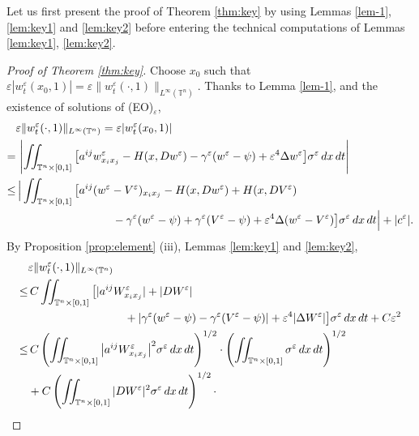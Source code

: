 \documentclass[12pt,reqno]{amsart}
\theoremstyle{plain}
\theoremstyle{remark}
\numberwithin{equation}{section}
\begin{document}
Let us first present the proof of Theorem \ref{thm:key}
by using Lemmas \ref{lem-1}, \ref{lem:key1} and \ref{lem:key2}
before entering the technical computations of Lemmas \ref{lem:key1}, \ref{lem:key2}.
\begin{proof}[Proof of Theorem {\rm\ref{thm:key}}]
Choose $x_0$ such that
${\varepsilon}|w^{\varepsilon}_t(x_0,1)|={\varepsilon}\|w^{\varepsilon}_t(\cdot,1)\|_{{L^{\infty}}({\mathbb{T}}^n)}$. 
Thanks to Lemma \ref{lem-1}, and the existence of solutions of (EO)$_{\varepsilon}$, 
\begin{align*}
&{\varepsilon} \| w^{\varepsilon}_t (\cdot,1) \|_{L^{\infty}({\mathbb{T}}^n)}={\varepsilon}|w^{\varepsilon}_t(x_0,1)| \\
=&\, \left| \iint_{{\mathbb{T}}^n\times[0,1]} 
\big[a^{ij}w^{\varepsilon}_{x_ix_j}-H(x,Dw^{\varepsilon})-{\gamma}^{\varepsilon}(w^{\varepsilon}-\psi)
+{\varepsilon}^4{\Delta} w^{\varepsilon}\big] {\sigma}^{\varepsilon} \,dx\,dt \right| \\
\leq&\, 
\Big| \iint_{{\mathbb{T}}^n\times[0,1]} 
\big[a^{ij}(w^{\varepsilon}-V^{\varepsilon})_{x_ix_j}-H(x,Dw^{\varepsilon})+H(x,DV^{\varepsilon})\\
&\hspace*{3cm}
-{\gamma}^{\varepsilon}(w^{\varepsilon}-\psi)+{\gamma}^{\varepsilon}(V^{\varepsilon}-\psi)
+{\varepsilon}^4{\Delta} (w^{\varepsilon}-V^{\varepsilon})\big] {\sigma}^{\varepsilon} \,dx\,dt \Big| + |c^{\varepsilon}|. 
\end{align*}
By Proposition \ref{prop:element} (iii), Lemmas \ref{lem:key1} and \ref{lem:key2}, 
\begin{align*}
&{\varepsilon} \| w^{\varepsilon}_t (\cdot,1) \|_{L^{\infty}({\mathbb{T}}^n)}\\
\le&\, 
C\iint_{{\mathbb{T}}^n\times[0,1]} 
\big[ 
|a^{ij}W^{\varepsilon}_{x_ix_j}|+|DW^{\varepsilon}| \\
&\hspace*{3cm}
+|{\gamma}^{\varepsilon}(w^{\varepsilon}-\psi)-{\gamma}^{\varepsilon}(V^{\varepsilon}-\psi)|
+{\varepsilon}^4|{\Delta} W^{\varepsilon}| \big] {\sigma}^{\varepsilon} \,dx\,dt + C {\varepsilon}^2 \\
\le&\, 
C\left(\iint_{{\mathbb{T}}^n\times[0,1]} 
\big|a^{ij}W^{\varepsilon}_{x_ix_j}\big|^2{\sigma}^{\varepsilon}\,dx\,dt\right)^{1/2}\cdot
\left(\iint_{{\mathbb{T}}^n\times[0,1]} {\sigma}^{\varepsilon}\,dx\,dt\right)^{1/2}\\
&+
C\left(\iint_{{\mathbb{T}}^n\times[0,1]} 
|DW^{\varepsilon}|^2{\sigma}^{\varepsilon}\,dx\,dt\right)^{1/2} \cdot

\end{align*}
\end{proof}
\end{document}
